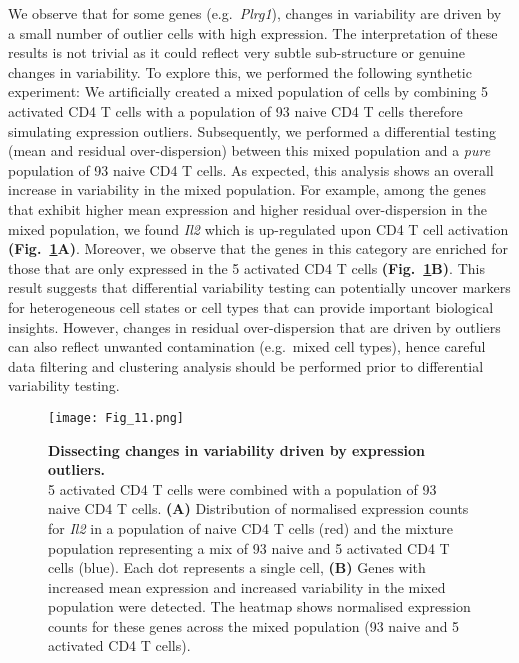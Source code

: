We observe that for some genes (e.g.~\textit{Plrg1}), changes in variability are driven by a small number of outlier cells with high expression. 
The interpretation of these results is not trivial as it could reflect very subtle sub-structure or genuine changes in variability. 
To explore this, we performed the following synthetic experiment: We artificially created a mixed population of cells by combining 5 activated CD4\plus{} T cells with a population of 93 naive CD4\plus{} T cells therefore simulating expression outliers. 
Subsequently, we performed a differential testing (mean and residual over-dispersion) between this mixed population and a \textit{pure} population of 93 naive CD4\plus{} T cells. 
As expected, this analysis shows an overall increase in variability in the mixed population. 
For example, among the genes that exhibit higher mean expression and higher residual over-dispersion in the mixed population, we found \textit{Il2} which is up-regulated upon CD4\plus{} T cell activation \textbf{(Fig.~\ref{fig2:mixture_population}A)}. 
Moreover, we observe that the genes in this category are enriched for those that are only expressed in the 5 activated CD4\plus{} T cells \textbf{(Fig.~\ref{fig2:mixture_population}B)}. 
This result suggests that differential variability testing can potentially uncover markers for heterogeneous cell states or cell types that can provide important biological insights. 
However, changes in residual over-dispersion that are driven by outliers can also reflect unwanted contamination (e.g.~mixed cell types), hence careful data filtering and clustering analysis should be performed prior to differential variability testing. 

\begin{figure}[!h]
\centering
\texttt{[image: Fig\_11.png]}
\caption[Dissecting changes in variability driven by expression outliers]{\textbf{Dissecting changes in variability driven by expression outliers.}\\
5 activated CD4\plus{} T cells were combined with a population of 93 naive CD4\plus{} T cells. 
\textbf{(A)} Distribution of normalised expression counts for \textit{Il2} in a population of naive CD4\plus{} T cells (red) and the mixture population representing a mix of 93 naive and 5 activated CD4\plus{} T cells (blue). 
Each dot represents a single cell, \textbf{(B)} Genes with increased mean expression and increased variability in the mixed population were detected. 
The heatmap shows normalised expression counts for these genes across the mixed population (93 naive and 5 activated CD4\plus{} T cells).}
\label{fig2:mixture_population}
\end{figure}

